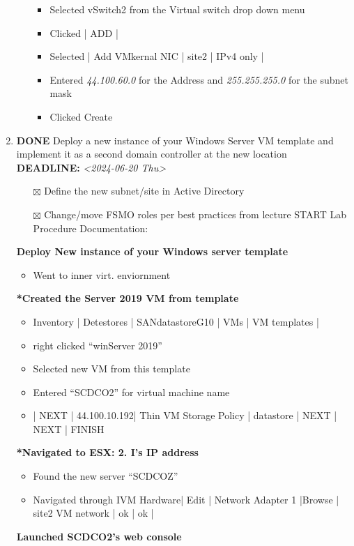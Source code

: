 \documentclass[letterpaper]{article}
\begin{document}
\begin{enumerate}
\begin{itemize}
\begin{itemize}
\item Selected vSwitch2 from the Virtual switch drop down menu
\item Clicked | ADD |
\item Selected | Add VMkernal NIC | site2 | IPv4 only |
\item Entered \emph{44.100.60.0} for the Address and \emph{255.255.255.0} for the subnet mask
\item Clicked Create
\end{itemize}
\end{itemize}
\item {\bfseries\sffamily DONE} Deploy a new instance of your Windows Server VM template and implement it as a second domain controller at the new location
\label{sec:org2ffb7b8}
\noindent\textbf{DEADLINE:} \textit{<2024-06-20 Thu>}\\[0pt]
\begin{itemize}
\item[{$\boxtimes$}] Define the new subnet/site in Active Directory
\item[{$\boxtimes$}] Change/move FSMO roles per best practices from lecture
START Lab Procedure Documentation:
\end{itemize}
\textbf{Deploy New instance of your Windows server template}
\begin{itemize}
\item Went to inner virt. enviornment
\end{itemize}
\textbf{*Created the Server 2019 VM from template}
\begin{itemize}
\item Inventory | Detestores | SANdatastoreG10 | VMs | VM templates |
\item right clicked ``winServer 2019''
\item Selected new VM from this template
\item Entered ``SCDCO2'' for virtual machine name
\item | NEXT | 44.100.10.192| Thin VM Storage Policy | datastore | NEXT | NEXT | FINISH
\end{itemize}
\textbf{*Navigated to ESX: 2. I's IP address}
\begin{itemize}
\item Found the new server ``SCDCOZ''
\item Navigated through IVM Hardware| Edit | Network Adapter 1 |Browse | site2 VM network | ok | ok |
\end{itemize}
\textbf{Launched SCDCO2's web console}
\begin{itemize}

\end{itemize}
\end{enumerate}
\end{document}
